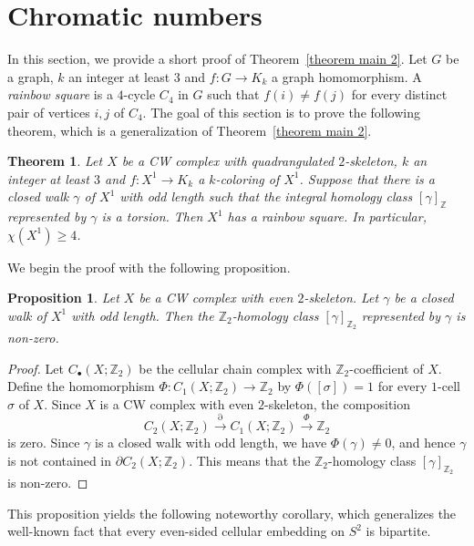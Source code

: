 \documentclass[11pt, amsfonts]{amsart}
\numberwithin{equation}{section}
\newtheorem{theorem}[thm]{Theorem}
\newtheorem{proposition}[thm]{Proposition}
\theoremstyle{definition}
\theoremstyle{remark}
\newcommand{\ZZ}{\mathbb{Z}}
\begin{document}
\section{Chromatic numbers} \label{section chromatic}

In this section, we provide a short proof of Theorem~\ref{theorem main 2}. Let $G$ be a graph, $k$ an integer at least $3$ and $f \colon G \to K_k$ a graph homomorphism. A \emph{rainbow square} is a $4$-cycle $C_4$ in $G$ such that $f(i) \ne f(j)$ for every distinct pair of vertices $i, j$ of $C_4$. The goal of this section is to prove the following theorem, which is a generalization of Theorem~\ref{theorem main 2}.

\begin{theorem} \label{theorem chromatic}
Let $X$ be a CW complex with quadrangulated $2$-skeleton, $k$ an integer at least $3$ and $f \colon X^1 \to K_k$ a $k$-coloring of $X^1$. Suppose that there is a closed walk $\gamma$ of $X^1$ with odd length such that the integral homology class $[\gamma]_\ZZ$ represented by $\gamma$ is a torsion. Then $X^1$ has a rainbow square. In particular, $\chi(X^1) \ge 4$.
\end{theorem}

We begin the proof with the following proposition.

\begin{proposition} \label{proposition odd cycle}
Let $X$ be a CW complex with even $2$-skeleton. Let $\gamma$ be a closed walk of $X^1$ with odd length. Then the $\ZZ_2$-homology class $[\gamma]_{\ZZ_2}$ represented by $\gamma$ is non-zero.
\end{proposition}
\begin{proof}
Let $C_\bullet(X; \ZZ_2)$ be the cellular chain complex with $\ZZ_2$-coefficient of $X$. Define the homomorphism $\Phi \colon C_1(X; \ZZ_2) \to \ZZ_2$ by $\Phi([\sigma]) = 1$ for every $1$-cell $\sigma$ of $X$. Since $X$ is a CW complex with even $2$-skeleton, the composition
\[ C_2(X ; \ZZ_2) \xrightarrow{\partial} C_1(X; \ZZ_2) \xrightarrow{\Phi} \ZZ_2 \]
is zero. Since $\gamma$ is a closed walk with odd length, we have $\Phi(\gamma) \ne 0$, and hence $\gamma$ is not contained in $\partial C_2(X; \ZZ_2)$. This means that the $\ZZ_2$-homology class $[\gamma]_{\ZZ_2}$ is non-zero.
\end{proof}

This proposition yields the following noteworthy corollary, which generalizes the well-known fact that every even-sided cellular embedding on \( S^2 \) is bipartite.
\end{document}
